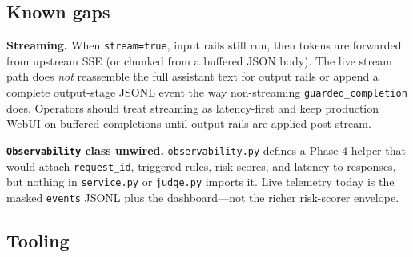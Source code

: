 \documentclass[
  11pt,
]{article}
\begin{document}
\subsection{Known gaps}\label{known-gaps}

\textbf{Streaming.} When \texttt{stream=true}, input rails still run,
then tokens are forwarded from upstream SSE (or chunked from a buffered
JSON body). The live stream path does \emph{not} reassemble the full
assistant text for output rails or append a complete output-stage JSONL
event the way non-streaming \texttt{guarded\_completion} does. Operators
should treat streaming as latency-first and keep production WebUI on
buffered completions until output rails are applied post-stream.

\textbf{\texttt{Observability} class unwired.} \texttt{observability.py}
defines a Phase-4 helper that would attach \texttt{request\_id},
triggered rules, risk scores, and latency to responses, but nothing in
\texttt{service.py} or \texttt{judge.py} imports it. Live telemetry
today is the masked \texttt{events} JSONL plus the dashboard---not the
richer risk-scorer envelope.

\subsection{Tooling}\label{tooling-3}
\end{document}
